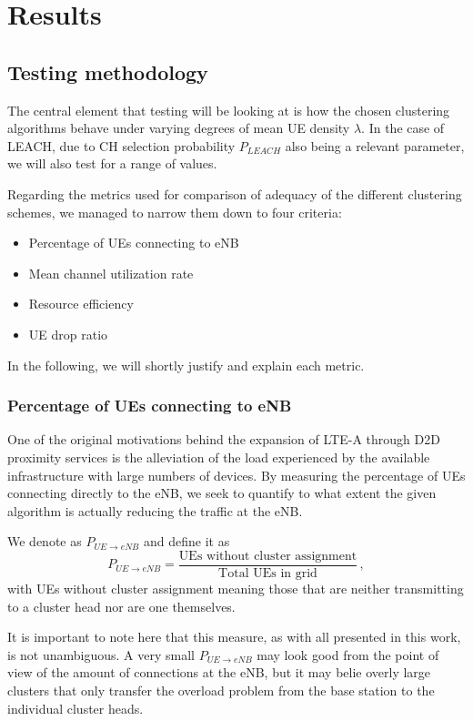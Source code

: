 \chapter{Results} \label{Results}

\section{Testing methodology}
The central element that testing will be looking at is how the chosen clustering algorithms behave under varying degrees of mean UE density $\lambda$. In the case of LEACH, due to CH selection probability $P_{LEACH}$ also being a relevant parameter, we will also test for a range of values. 

Regarding the metrics used for comparison of adequacy of the different clustering schemes, we managed to narrow them down to four criteria:

\begin{itemize}
\item Percentage of UEs connecting to eNB
\item Mean channel utilization rate
\item Resource efficiency
\item UE drop ratio
\end{itemize}

In the following, we will shortly justify and explain each metric.

\subsection{Percentage of UEs connecting to eNB}
One of the original motivations behind the expansion of LTE-A through D2D proximity services is the alleviation of the load experienced by the available infrastructure with large numbers of devices. By measuring the percentage of UEs connecting directly to the eNB, we seek to quantify to what extent the given algorithm is actually reducing the traffic at the eNB.

We denote as $P_{UE\rightarrow eNB}$ and define it as
\begin{equation}\label{eq:con_eNB}
P_{UE\rightarrow eNB} = \frac {\text{UEs without cluster assignment}}{\text{Total UEs in grid}}\,,
\end{equation}
with UEs without cluster assignment meaning those that are neither transmitting to a cluster head nor are one themselves.

It is important to note here that this measure, as with all presented in this work, is not unambiguous. A very small $P_{UE\rightarrow eNB}$ may look good from the point of view of the amount of connections at the eNB, but it may belie overly large clusters that only transfer the overload problem from the base station to the individual cluster heads.

